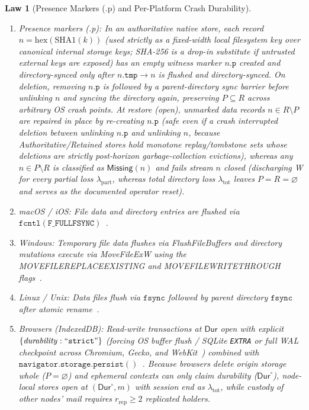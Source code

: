 \documentclass[journal]{IEEEtran}
\newtheorem{law}{Law}
\DeclareRobustCommand{\code}[1]{{\ttfamily\renewcommand{\_}{\textunderscore\allowbreak}#1}}
\begin{document}
\begin{law}[Presence Markers (\code{.p}) and Per-Platform Crash Durability]\label{law:platform-durability}
\leavevmode
\begin{enumerate}[leftmargin=1.5em]
\item \emph{Presence markers (\code{.p}):} In an authoritative native store, each
record $n=\mathrm{hex}(\mathrm{SHA1}(k))$ (used strictly as a fixed-width local filesystem key over canonical internal storage keys; SHA-256 is a drop-in substitute if untrusted external keys are exposed) has an empty witness marker $n.\mathtt{p}$
created and directory-synced only after $n.\mathtt{tmp}\to n$ is flushed and directory-synced.
On deletion, removing $n.\mathtt{p}$ is followed by a parent-directory sync barrier before unlinking $n$ and syncing the directory again, preserving $P\subseteq R$ across arbitrary OS crash points.
At restore (\code{open}), unmarked data records $n\in R\setminus P$ are repaired in place by re-creating $n.\mathtt{p}$ (safe even if a crash interrupted deletion between unlinking $n.\mathtt{p}$ and unlinking $n$, because \code{Authoritative}/\code{Retained} stores hold monotone replay/tombstone sets whose deletions are strictly post-horizon garbage-collection evictions), whereas any $n\in P\setminus R$ is classified as $\mathsf{Missing}(n)$ and fails
stream $n$ closed (discharging W for every partial loss $\lambda_{\mathrm{part}}$,
whereas total directory loss $\lambda_{\mathrm{tot}}$ leaves $P=R=\varnothing$ and serves as the documented operator reset).
\item \emph{macOS / iOS:} File data and directory entries are flushed via
$\mathtt{fcntl}(\mathtt{F\_FULLFSYNC})$~\cite{AppleFsync}.
\item \emph{Windows:} Temporary file data flushes via \code{FlushFileBuffers} and
directory mutations execute via \code{MoveFileExW} using the
\code{MOVEFILE\_REPLACE\_EXISTING} and \code{MOVEFILE\_WRITE\_THROUGH} flags~\cite{MoveFileEx}.
\item \emph{Linux / Unix:} Data files flush via $\mathtt{fsync}$ followed by
parent directory $\mathtt{fsync}$ after atomic rename~\cite{Pillai2014}.
\item \emph{Browsers (IndexedDB):} Read-write transactions at $\mathsf{Dur}$
open with explicit $\{\mathit{durability}:\text{``\texttt{strict}''}\}$ (forcing
OS buffer flush / SQLite \texttt{EXTRA} or full WAL checkpoint across Chromium,
Gecko, and WebKit~\cite{IndexedDB3,ChromeDurability,GeckoIDB,WebKitIDB,SQLiteWAL})
combined with $\mathtt{navigator.storage.persist()}$~\cite{MDNEviction}.  Because
browsers delete origin storage whole ($P=\varnothing$) and ephemeral contexts can
only claim durability ($\mathsf{Dur}^\circ$), node-local stores open at
$(\mathsf{Dur}^\circ,m)$ with session end as $\lambda_{\mathrm{tot}}$, while
custody of other nodes' mail requires $r_{\mathrm{rep}}\ge 2$ replicated holders.
\end{enumerate}
\end{law}
\end{document}
